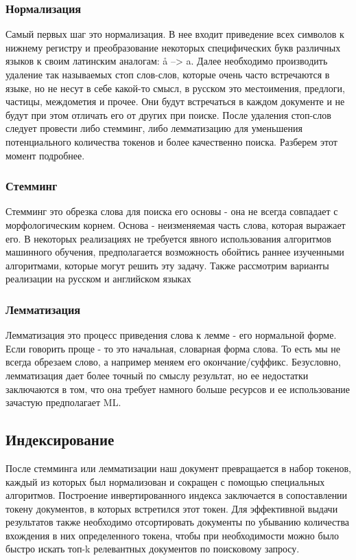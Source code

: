 \subsubsection{Нормализация}
Самый первых шаг это нормализация. В нее входит приведение всех символов к нижнему регистру и преобразование некоторых 
специфических букв различных языков к своим латинским аналогам: å --> a. Далее необходимо производить удаление так 
называемых стоп слов-слов, которые очень часто встречаются в языке, но не несут в себе какой-то смысл, в русском это 
местоимения, предлоги, частицы, междометия и прочее. Они будут встречаться в каждом документе и не будут при этом 
отличать его от других при поиске. После удаления стоп-слов следует провести либо стемминг, либо лемматизацию для 
уменьшения потенциального количества токенов и более качественно поиска. Разберем этот момент подробнее. 

\subsubsection{Стемминг}
Стемминг \cite{stem1} это обрезка слова для поиска его основы - она не всегда совпадает с 
морфологическим корнем. Основа - неизменяемая часть слова, которая выражает его. В некоторых реализациях не требуется явного 
использования алгоритмов машинного обучения, 
предполагается возможность обойтись раннее изученными алгоритмами, которые могут решить эту задачу.
Также рассмотрим варианты реализации на русском и английском языках

\subsubsection{Лемматизация}
Лемматизация \cite{lemma1} \cite{lemmacomp} это процесс приведения слова к лемме - его нормальной форме. Если говорить проще - то 
это начальная, словарная форма слова. То есть мы не всегда обрезаем слово, а например меняем его окончание/суффикс. 
Безусловно, лемматизация дает более точный по смыслу результат, но ее недостатки заключаются в том, что она требует 
намного больше ресурсов и ее использование зачастую предполагает ML. 

\subsection{Индексирование}
После стемминга или лемматизации наш документ превращается в набор токенов, каждый из которых был 
нормализован и сокращен с помощью специальных алгоритмов. Построение инвертированного индекса заключается 
в сопоставлении токену документов, в которых встретился этот токен. Для эффективной выдачи результатов 
также необходимо отсортировать документы по убыванию количества вхождения в них определенного токена, чтобы при
необходимости можно было быстро искать топ-k релевантных документов по поисковому запросу. 

